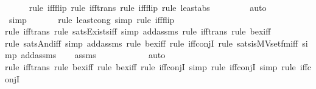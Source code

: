 \begin{isabellebody}
\ \ \ \ \ \isamarkupfalse%
{\isacharparenleft}{\kern0pt}rule\ iff{\isacharunderscore}{\kern0pt}flip{\isacharcomma}{\kern0pt}\ rule\ iff{\isacharunderscore}{\kern0pt}trans{\isacharcomma}{\kern0pt}\ rule\ iff{\isacharunderscore}{\kern0pt}flip{\isacharcomma}{\kern0pt}\ rule\ least{\isacharunderscore}{\kern0pt}abs{\isacharparenright}{\kern0pt}\isanewline
\ \ \ \ \ \ \ \isamarkupfalse%
\ auto{\isacharbrackleft}{\kern0pt}{}{\isacharbrackright}{\kern0pt}\isanewline
\ \ \ \ \ \isamarkupfalse%
\ simp\ \isanewline
\ \ \ \ \ \isamarkupfalse%
{\isacharparenleft}{\kern0pt}rule\ least{\isacharunderscore}{\kern0pt}cong{\isacharcomma}{\kern0pt}\ simp{\isacharcomma}{\kern0pt}\ rule\ iff{\isacharunderscore}{\kern0pt}flip{\isacharparenright}{\kern0pt}\isanewline
\ \ \ \ \ \isamarkupfalse%
{\isacharparenleft}{\kern0pt}rule\ iff{\isacharunderscore}{\kern0pt}trans{\isacharcomma}{\kern0pt}\ rule\ sats{\isacharunderscore}{\kern0pt}Exists{\isacharunderscore}{\kern0pt}iff{\isacharcomma}{\kern0pt}\ simp\ add{\isacharcolon}{\kern0pt}assms{\isacharcomma}{\kern0pt}\ rule\ iff{\isacharunderscore}{\kern0pt}trans{\isacharcomma}{\kern0pt}\ rule\ bex{\isacharunderscore}{\kern0pt}iff{\isacharparenright}{\kern0pt}{\isacharplus}{\kern0pt}\isanewline
\ \ \ \ \ \ \ \isamarkupfalse%
{\isacharparenleft}{\kern0pt}rule\ sats{\isacharunderscore}{\kern0pt}And{\isacharunderscore}{\kern0pt}iff{\isacharcomma}{\kern0pt}\ simp\ add{\isacharcolon}{\kern0pt}assms{\isacharcomma}{\kern0pt}\ rule\ bex{\isacharunderscore}{\kern0pt}iff{\isacharcomma}{\kern0pt}\ rule\ iff{\isacharunderscore}{\kern0pt}conjI{}{\isacharcomma}{\kern0pt}\ rule\ sats{\isacharunderscore}{\kern0pt}is{\isacharunderscore}{\kern0pt}MVset{\isacharunderscore}{\kern0pt}fm{\isacharunderscore}{\kern0pt}iff{\isacharcomma}{\kern0pt}\ simp\ add{\isacharcolon}{\kern0pt}assms{\isacharparenright}{\kern0pt}\isanewline
\ \ \isamarkupfalse%
\ assms\isanewline
\ \ \ \ \ \ \ \ \ \ \isamarkupfalse%
\ auto{\isacharbrackleft}{\kern0pt}{}{\isacharbrackright}{\kern0pt}\isanewline
\ \ \ \ \ \isamarkupfalse%
{\isacharparenleft}{\kern0pt}rule\ iff{\isacharunderscore}{\kern0pt}trans{\isacharcomma}{\kern0pt}\ rule\ bex{\isacharunderscore}{\kern0pt}iff{\isacharcomma}{\kern0pt}\ rule\ bex{\isacharunderscore}{\kern0pt}iff{\isacharcomma}{\kern0pt}\ rule\ iff{\isacharunderscore}{\kern0pt}conjI{}{\isacharcomma}{\kern0pt}\ simp{\isacharcomma}{\kern0pt}\ rule\ iff{\isacharunderscore}{\kern0pt}conjI{}{\isacharcomma}{\kern0pt}\ simp{\isacharcomma}{\kern0pt}\ rule\ iff{\isacharunderscore}{\kern0pt}conjI{}{\isacharparenright}{\kern0pt}\isanewline

\end{isabellebody}
